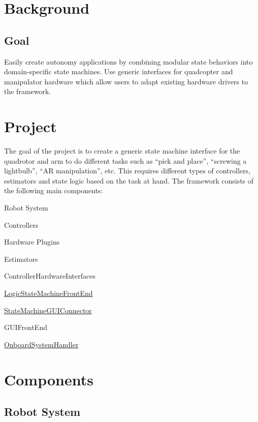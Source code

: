 \section*{Background}

\subsection*{Goal}

Easily create autonomy applications by combining modular state behaviors into domain-\/specific state machines. Use generic interfaces for quadcopter and manipulator hardware which allow users to adapt existing hardware drivers to the framework.

\section*{Project}

The goal of the project is to create a generic state machine interface for the quadrotor and arm to do different tasks such as “pick and place”, “screwing a lightbulb”, “\-A\-R manipulation”, etc. This requires different types of controllers, estimators and state logic based on the task at hand. The framework consists of the following main components\-:


\begin{DoxyEnumerate}
\item Robot System
\begin{DoxyEnumerate}
\item Controllers
\item Hardware Plugins
\item Estimators
\item Controller\-Hardware\-Interfaces
\end{DoxyEnumerate}
\item \hyperlink{classLogicStateMachineFrontEnd}{Logic\-State\-Machine\-Front\-End}
\item \hyperlink{classStateMachineGUIConnector}{State\-Machine\-G\-U\-I\-Connector}
\item G\-U\-I\-Front\-End
\item \hyperlink{classOnboardSystemHandler}{Onboard\-System\-Handler}
\end{DoxyEnumerate}

\section*{Components}

\subsection*{Robot System}

